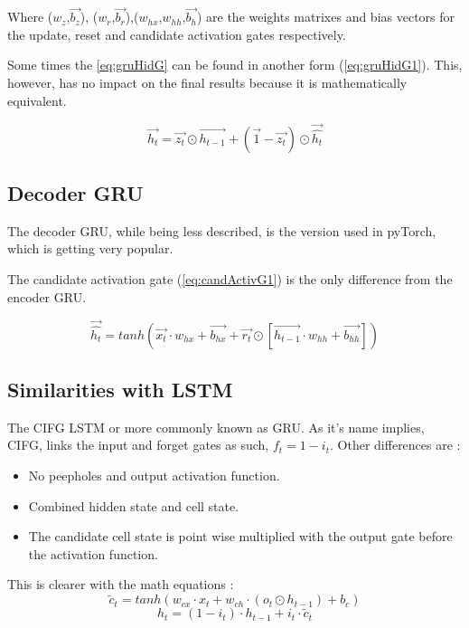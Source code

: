 Where ($w_z$,$\overrightarrow{b_z}$), ($w_r$,$\overrightarrow{b_r}$),($w_{hx}$,$w_{hh}$,$\overrightarrow{b_h}$) are the weights matrixes and bias vectors for the update, reset and candidate activation gates respectively.

Some times the \cref{eq:gruHidG} can be found in another form (\cref{eq:gruHidG1}). This, however, has no impact on the final results because it is mathematically equivalent.

\begin{equation}\label{eq:gruHidG1}
  \overrightarrow{h_t}=\overrightarrow{z_t}\odot \overrightarrow{h_{t-1}} + (\overrightarrow{1}-\overrightarrow{z_t})\odot \overrightarrow{\hat{h_t}}
\end{equation}

\subsection{Decoder \ac{GRU}}

The decoder \ac{GRU}, while being less described, is the version used in pyTorch, which is getting very popular.

The candidate activation gate (\cref{eq:candActivG1}) is the only difference from the encoder \ac{GRU}.

\begin{equation}\label{eq:candActivG1}
  \overrightarrow{\hat{h_t}}=tanh(\overrightarrow{x_t}\cdot w_{hx}+ \overrightarrow{b_{hx}}+\overrightarrow{r_t}\odot[\overrightarrow{h_{t-1}} \cdot w_{hh} + \overrightarrow{b_{hh}}])
\end{equation}

\subsection{Similarities with \ac{LSTM}}

The \ac{CIFG} \ac{LSTM} or more commonly known as \ac{GRU}. \cite{gru,gruKeras,gruPyTorch} As it's name implies, \acl{CIFG}, links the input and forget gates as such, $f_t=1-i_t$. Other differences are :
\begin{itemize}
  \item No peepholes and output activation function.
  \item Combined hidden state and cell state.
  \item The candidate cell state is point wise multiplied with the output gate before the activation function.
\end{itemize}

This is clearer with the math equations :
\begin{equation}\label{eq:cellGGRU}
  \tilde{c}_t = tanh(w_{cx}\cdot x_t + w_{ch}\cdot(o_t \odot h_{t-1}) + b_c)
\end{equation}
\begin{equation}\label{eq:hiddenGRU}
  h_t=(1-i_t)\cdot h_{t-1} + i_t \cdot \tilde{c}_t
\end{equation}
